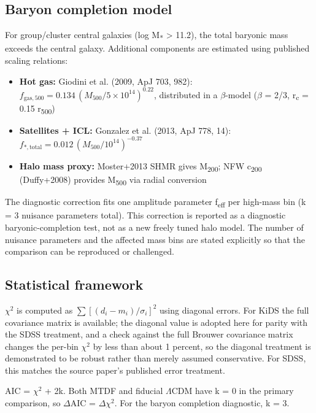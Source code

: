 \documentclass[11pt,a4paper]{article}
\begin{document}
\subsection{Baryon completion model}
For group/\allowbreak{}cluster central galaxies (log M\textsubscript{*} > 11.2), the total baryonic mass exceeds the central galaxy. Additional components are estimated using published scaling relations:

\begin{itemize}
  \item \textbf{Hot gas:} Giodini et al. (2009, ApJ 703, 982): \(f_{\mathrm{gas},500} = 0.134\,(M_{500}/5\times10^{14})^{0.22}\), distributed in a $\beta$-model ($\beta$ = 2/\allowbreak{}3, r\textsubscript{c} = 0.15 r\textsubscript{500})
  \item \textbf{Satellites + ICL:} Gonzalez et al. (2013, ApJ 778, 14): \(f_{*,\mathrm{total}} = 0.012\,(M_{500}/10^{14})^{-0.37}\)
  \item \textbf{Halo mass proxy:} Moster+2013 SHMR gives M\textsubscript{200}; NFW c\textsubscript{200} (Duffy+2008) provides M\textsubscript{500} via radial conversion
\end{itemize}

The diagnostic correction fits one amplitude parameter f\textsubscript{eff} per high-mass bin (k = 3 nuisance parameters total). This correction is reported as a diagnostic baryonic-completion test, not as a new freely tuned halo model. The number of nuisance parameters and the affected mass bins are stated explicitly so that the comparison can be reproduced or challenged.

\subsection{Statistical framework}
$\chi$$^{2}$ is computed as \(\sum [(d_i - m_i)/\sigma_i]^2\) using diagonal errors. For KiDS the full covariance matrix is available; the diagonal value is adopted here for parity with the SDSS treatment, and a check against the full Brouwer covariance matrix changes the per-bin $\chi$$^{2}$ by less than about 1 percent, so the diagonal treatment is demonstrated to be robust rather than merely assumed conservative. For SDSS, this matches the source paper's published error treatment.

AIC = $\chi$$^{2}$ + 2k. Both MTDF and fiducial $\Lambda$CDM have k = 0 in the primary comparison, so $\Delta$AIC = $\Delta$$\chi$$^{2}$. For the baryon completion diagnostic, k = 3.
\end{document}
